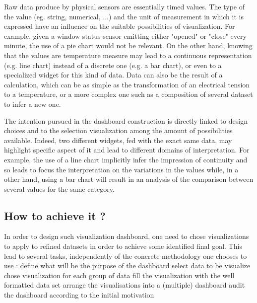 Raw data produce by physical sensors are essentially timed values. The
type of the value (eg. string, numerical, ...) and the unit of
measurement in which it is expressed have an influence on the suitable
possibilities of visualization.  For example, given a window status
sensor emitting either "opened" or "close" every minute, the use of a
pie chart would not be relevant. On the other hand, knowing that the
values are temperature measure may lead to a continuous representation
(e.g. line chart) instead of a discrete one (e.g. a bar chart), or
even to a specialized widget for this kind of data.
Data can also be the result of a calculation, which can be as simple
as the transformation of an electrical tension to a temperature, or a
more complex one such as a composition of several dataset to infer a
new one.

The intention pursued in the dashboard construction is directly linked
to design choices and to the selection visualization among the amount
of possibilities available.  Indeed, two different widgets, fed with
the exact same data, may highlight specific aspect of it and lead to
different domains of interpretation. For example, the use of a line
chart implicitly infer the impression of continuity and so leads to
focus the interpretation on the variations in the values while, in a
other hand, using a bar chart will result in an analysis of the
comparison between several values for the same category.

\subsection{How to achieve it ?}
In order to design such visualization dashboard, one need to chose
visualizations to apply to refined datasets in order to achieve some
identified final goal.  This lead to several tasks, independently of
the concrete methodology one chooses to use :  define what
will be the purpose of the dashboard  select data to be
visualize  chose visualization for each group of data
 fill the visualization with the well formatted data set
 arrange the visualisations into a (multiple) dashboard
 audit the dashboard according to the initial motivation

